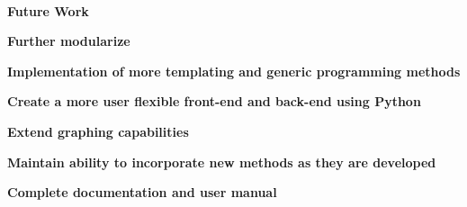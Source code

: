 \baselineskip=0.29in

\newpage
\noindent


\mbox{ }
\vskip0.5in
{\Huge
\begin{center}
{\bf Future Work}
\end{center}
}

\vskip0.5in
\begin{itemize}
{\Huge
 \item {\bf Further modularize}
 \item {\bf Implementation of more templating and generic programming
            methods}
 \item {\bf Create a more user flexible front-end and back-end using
            Python}
 \item {\bf Extend graphing capabilities}
 \item {\bf Maintain ability to incorporate new methods as they are
            developed}
 \item {\bf Complete documentation and user manual}
}
\end{itemize}
\vskip2.0in

